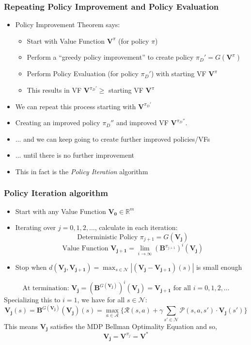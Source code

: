 \documentclass[handout]{beamer}
\newcommand{\bvpi}{\bm{V}^{\pi}}
\newcommand{\bvs}{\bm{V}^*}
\begin{document}
\begin{frame}
\frametitle{Repeating Policy Improvement and Policy Evaluation}
\pause
\begin{itemize}[<+->]
\item Policy Improvement Theorem says:
\begin{itemize}[<+->]
\item Start with Value Function $\bvpi$ (for policy $\pi$)
\item Perform a ``greedy policy improvement'' to create policy $\pi_D' = G(\bvpi)$
\item Perform Policy Evaluation (for policy $\pi_D'$) with starting VF $\bvpi$
\item This results in VF $\bm{V}^{\pi_D'} \geq$ starting VF $\bvpi$
\end{itemize}
\item We can repeat this process starting with $\bm{V}^{\pi_D'}$
\item Creating an improved policy $\pi_D''$ and improved VF $\bm{V}^{\pi_D''}$.
\item ... and we can keep going to create further improved policies/VFs
\item ... until there is no further improvement
\item This in fact is the {\em Policy Iteration} algorithm
\end{itemize}
\end{frame}

\begin{frame}
\frametitle{Policy Iteration algorithm}
\pause
\begin{itemize}[<+->]
\item Start with any Value Function $\bm{V_0} \in \mathbb{R}^m$
\item Iterating over $j = 0, 1, 2, \ldots$, calculate in each iteration:
$$\text{ Deterministic Policy } \pi_{j+1} = G(\bm{V_j})$$
$$\text{ Value Function } \bm{V_{j+1}} = \lim_{i\rightarrow \infty} (\bm{B}^{\pi_{j+1}})^i(\bm{V_j})$$
\item Stop when $d(\bm{V_j}, \bm{V_{j+1}}) = \max_{s \in \mathcal{N}} |(\bm{V_j} - \bm{V_{j+1}})(s)|$ is small enough
\end{itemize}
\pause
$$\text{At termination: } \bm{V_j} = (\bm{B}^{G(\bm{V_j})})^i(\bm{V_j}) = \bm{V_{j+1}} \text{ for all } i = 0, 1, 2, \ldots$$
\pause
Specializing this to $i=1$, we have for all $s \in \mathcal{N}$:
$$\bm{V_j}(s) = \bm{B}^{G(\bm{V_j})}(\bm{V_j})(s) = \max_{a \in \mathcal{A}} \{\mathcal{R}(s,a) + \gamma \sum_{s' \in \mathcal{N}} \mathcal{P}(s,a,s') \cdot \bm{V_j}(s')\}$$
\pause
This means $\bm{V_j}$ satisfies the MDP Bellman Optimality Equation and so,
$$\bm{V_j} = \bm{V}^{\pi_j} = \bvs$$
\end{frame}
\end{document}
